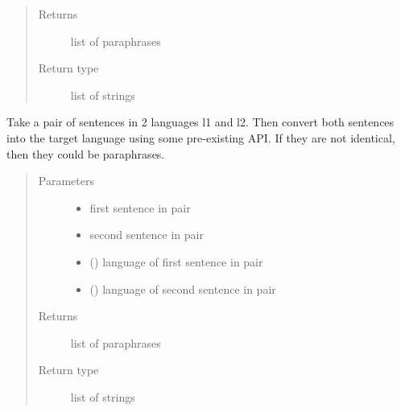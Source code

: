 \documentclass[letterpaper,10pt,english]{sphinxmanual}
\begin{document}
\begin{fulllineitems}
\begin{fulllineitems}
\begin{quote}
\begin{description}
\item[{Returns}] \leavevmode
list of paraphrases

\item[{Return type}] \leavevmode
list of strings

\end{description}\end{quote}

\end{fulllineitems}


\begin{fulllineitems}
\label{\detokenize{ParaphraseDatasetCreation.Malayalam:ParaphraseDatasetCreation.Malayalam.Positive.PositiveParaphrases.translate_pairs_to_paraphrases}}
Take a pair of sentences in 2 languages l1 and l2. Then convert both 
sentences into the target language using some pre-existing API. If they are 
not identical, then they could be paraphrases.
\begin{quote}\begin{description}
\item[{Parameters}] \leavevmode\begin{itemize}
\item {} 
 \textendash{} first sentence in pair

\item {} 
 \textendash{} second sentence in pair

\item {} 
 () \textendash{} language of first sentence in pair

\item {} 
 () \textendash{} language of second sentence in pair

\end{itemize}

\item[{Returns}] \leavevmode
list of paraphrases

\item[{Return type}] \leavevmode
list of strings

\end{description}\end{quote}

\end{fulllineitems}


\end{fulllineitems}
\end{document}
